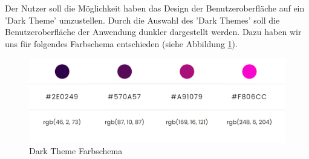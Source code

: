 Der Nutzer soll die Möglichkeit haben das Design der Benutzeroberfläche auf ein 'Dark Theme' umzustellen. Durch die Auswahl des 'Dark Themes' soll die Benutzeroberfläche der Anwendung dunkler dargestellt werden. Dazu haben wir uns für folgendes Farbschema entschieden (siehe Abbildung \ref{mu:darkmode}).

\begin{figure}[!ht]
    \centering
    \includegraphics[width=\textwidth]{Bilder/Mockup/colorscheme_darkmode.PNG}
    \caption{Dark Theme Farbschema}
    \label{mu:darkmode}
\end{figure}